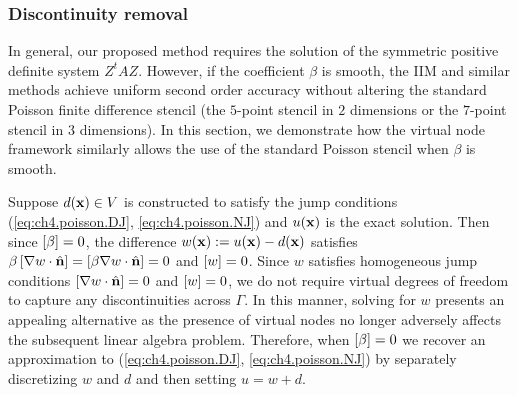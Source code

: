 \subsubsection{Discontinuity removal} \label{subsubsec:ch4.discretization.interface.discontinuityremoval}

In general, our proposed method requires the solution of the symmetric positive definite system $Z^tAZ$. However, if the coefficient $\beta$ is smooth, the IIM and similar methods achieve uniform second order accuracy without altering the standard Poisson finite difference stencil (the $5$-point stencil in $2$ dimensions or the $7$-point stencil in $3$ dimensions). In this section, we demonstrate how the virtual node framework similarly allows the use of the standard Poisson stencil when $\beta$ is smooth.

Suppose $d(\mathbf{x}) \in V$ is constructed to satisfy the jump conditions (\ref{eq:ch4.poisson.DJ}, \ref{eq:ch4.poisson.NJ}) and $u(\mathbf{x})$ is the exact solution. Then since $\left[ \beta \right] = 0$, the difference $w(\mathbf{x}) := u(\mathbf{x}) - d(\mathbf{x})$ satisfies $\beta \left[ \nabla w \cdot \hat{\mathbf{n}} \right] = \left[ \beta \nabla w \cdot \hat{\mathbf{n}} \right] = 0$ and $\left[ w \right] = 0$. Since $w$ satisfies homogeneous jump conditions $\left[ \nabla w \cdot \hat{\mathbf{n}} \right] = 0$ and $\left[ w \right] = 0$, we do not require virtual degrees of freedom to capture any discontinuities across $\Gamma$. In this manner, solving for $w$ presents an appealing alternative as the presence of virtual nodes no longer adversely affects the subsequent linear algebra problem. Therefore, when $\left[ \beta \right] = 0$ we recover an approximation to (\ref{eq:ch4.poisson.DJ}, \ref{eq:ch4.poisson.NJ}) by separately discretizing $w$ and $d$ and then setting $u = w + d$.

